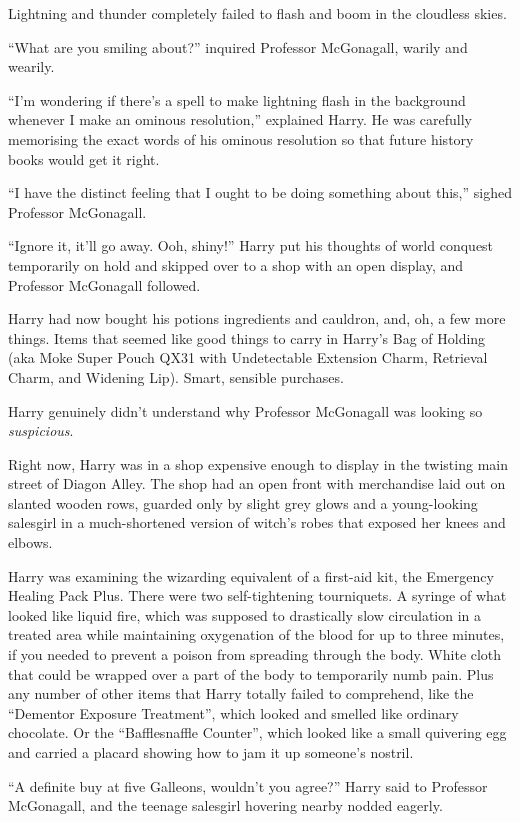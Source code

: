 Lightning and thunder completely failed to flash and boom in the cloudless skies.

“What are you smiling about?” inquired Professor McGonagall, warily and wearily.

“I’m wondering if there’s a spell to make lightning flash in the background whenever I make an ominous resolution,” explained Harry. He was carefully memorising the exact words of his ominous resolution so that future history books would get it right.

“I have the distinct feeling that I ought to be doing something about this,” sighed Professor McGonagall.

“Ignore it, it’ll go away. Ooh, shiny!” Harry put his thoughts of world conquest temporarily on hold and skipped over to a shop with an open display, and Professor McGonagall followed.

\later

Harry had now bought his potions ingredients and cauldron, and, oh, a few more things. Items that seemed like good things to carry in Harry’s Bag of Holding (aka Moke Super Pouch QX31 with Undetectable Extension Charm, Retrieval Charm, and Widening Lip). Smart, sensible purchases.

Harry genuinely didn’t understand why Professor McGonagall was looking so \emph{suspicious}.

Right now, Harry was in a shop expensive enough to display in the twisting main street of Diagon Alley. The shop had an open front with merchandise laid out on slanted wooden rows, guarded only by slight grey glows and a young-looking salesgirl in a much-shortened version of witch’s robes that exposed her knees and elbows.

Harry was examining the wizarding equivalent of a first-aid kit, the Emergency Healing Pack Plus. There were two self-tightening tourniquets. A syringe of what looked like liquid fire, which was supposed to drastically slow circulation in a treated area while maintaining oxygenation of the blood for up to three minutes, if you needed to prevent a poison from spreading through the body. White cloth that could be wrapped over a part of the body to temporarily numb pain. Plus any number of other items that Harry totally failed to comprehend, like the “Dementor Exposure Treatment”, which looked and smelled like ordinary chocolate. Or the “Bafflesnaffle Counter”, which looked like a small quivering egg and carried a placard showing how to jam it up someone’s nostril.

“A definite buy at five Galleons, wouldn’t you agree?” Harry said to Professor McGonagall, and the teenage salesgirl hovering nearby nodded eagerly.

